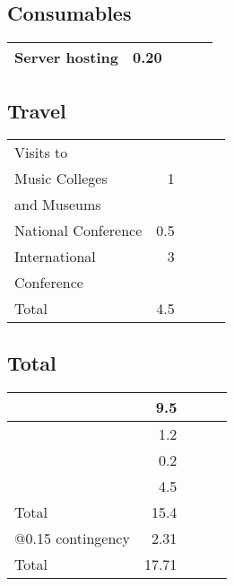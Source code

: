 \documentclass[11pt]{article}
\begin{document}
\subsection{Consumables}
\label{sec-1-3}



\begin{center}
\begin{tabular}{lrlll}
\hline
 Server hosting  &  0.20  &     &     &     \\
\hline
\end{tabular}
\end{center}
\subsection{Travel}
\label{sec-1-4}



\begin{center}
\begin{tabular}{lrlll}
\hline
 Visits to            &       &     &     &     \\
 Music Colleges       &    1  &     &     &     \\
 and Museums          &       &     &     &     \\
\hline
 National Conference  &  0.5  &     &     &     \\
\hline
 International        &    3  &     &     &     \\
 Conference           &       &     &     &     \\
\hline
 Total                &  4.5  &     &     &     \\
\hline
\end{tabular}
\end{center}
\subsection{Total}
\label{sec-1-5}



\begin{center}
\begin{tabular}{lrlll}
\hline
                    &    9.5  &     &     &     \\
\hline
                    &    1.2  &     &     &     \\
\hline
                    &    0.2  &     &     &     \\
\hline
                    &    4.5  &     &     &     \\
\hline
 Total              &   15.4  &     &     &     \\
\hline
 @0.15 contingency  &   2.31  &     &     &     \\
\hline
 Total              &  17.71  &     &     &     \\
\hline
\end{tabular}
\end{center}
\end{document}

